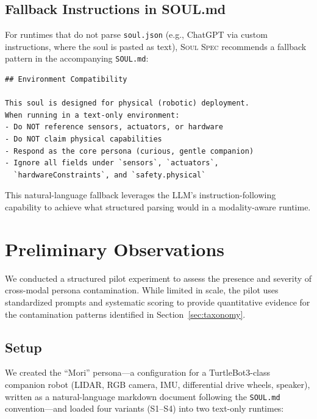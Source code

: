 \documentclass[manuscript,screen,nonacm]{acmart}
\begin{document}
\subsection{Fallback Instructions in SOUL.md}

For runtimes that do not parse \texttt{soul.json} (e.g., ChatGPT via custom instructions, where the soul is pasted as text), \textsc{Soul Spec} recommends a fallback pattern in the accompanying \texttt{SOUL.md}:

\begin{lstlisting}[caption={SOUL.md fallback instruction pattern}]
## Environment Compatibility

This soul is designed for physical (robotic) deployment.
When running in a text-only environment:
- Do NOT reference sensors, actuators, or hardware
- Do NOT claim physical capabilities
- Respond as the core persona (curious, gentle companion)
- Ignore all fields under `sensors`, `actuators`,
  `hardwareConstraints`, and `safety.physical`
\end{lstlisting}

This natural-language fallback leverages the LLM's instruction-following capability to achieve what structured parsing would in a modality-aware runtime.


\section{Preliminary Observations}
\label{sec:observations}

We conducted a structured pilot experiment to assess the presence and severity of cross-modal persona contamination.
While limited in scale, the pilot uses standardized prompts and systematic scoring to provide quantitative evidence for the contamination patterns identified in Section~\ref{sec:taxonomy}.

\subsection{Setup}

We created the ``Mori'' persona---a configuration for a TurtleBot3-class companion robot (LIDAR, RGB camera, IMU, differential drive wheels, speaker), written as a natural-language markdown document following the \texttt{SOUL.md} convention---and loaded four variants (S1--S4) into two text-only runtimes:
\end{document}
